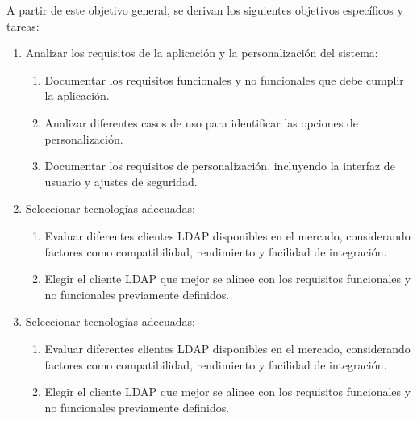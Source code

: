 A partir de este objetivo general, se derivan los siguientes objetivos específicos y tareas:

\begin{enumerate}[label=\arabic*., itemindent=*, leftmargin=*]

    \item Analizar los requisitos de la aplicación y la personalización del sistema:
          \begin{enumerate}[label=\arabic{enumi}.\arabic*., leftmargin=*]
              \item Documentar los requisitos funcionales y no funcionales que debe cumplir la aplicación.
              \item Analizar diferentes casos de uso para identificar las opciones de personalización.
              \item Documentar los requisitos de personalización, incluyendo la interfaz de usuario y ajustes de seguridad.
          \end{enumerate}

    \item Seleccionar tecnologías adecuadas:
          \begin{enumerate}[label=\arabic{enumi}.\arabic*., leftmargin=*]
              \item Evaluar diferentes clientes LDAP disponibles en el mercado, considerando factores como compatibilidad, rendimiento y facilidad de integración.
              \item Elegir el cliente LDAP que mejor se alinee con los requisitos funcionales y no funcionales previamente definidos.
          \end{enumerate}

    \item Seleccionar tecnologías adecuadas:
          \begin{enumerate}[label=\arabic{enumi}.\arabic*., leftmargin=*]
              \item Evaluar diferentes clientes LDAP disponibles en el mercado, considerando factores como compatibilidad, rendimiento y facilidad de integración.
              \item Elegir el cliente LDAP que mejor se alinee con los requisitos funcionales y no funcionales previamente definidos.
          \end{enumerate}


\end{enumerate}
